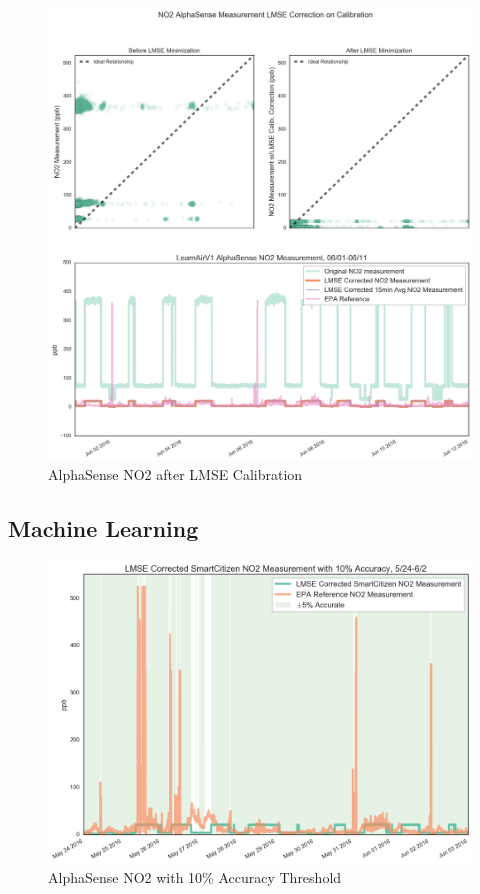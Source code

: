 \begin{figure}[htb]
 	\includegraphics[width=\textwidth]{figs/as_no2_lmse}               
 	 \caption{AlphaSense NO2 after LMSE Calibration}
  	\label{fig:as_no2_lmse}
\end{figure}








\subsection{Machine Learning}


\begin{figure}[htb]
 	\includegraphics[width=\textwidth]{figs/as_no2_with_10_accuracy_zoomed}               
 	 \caption{AlphaSense NO2 with 10\% Accuracy Threshold}
  	\label{fig:as_no2_with_10_accuracy_zoomed}
\end{figure}

